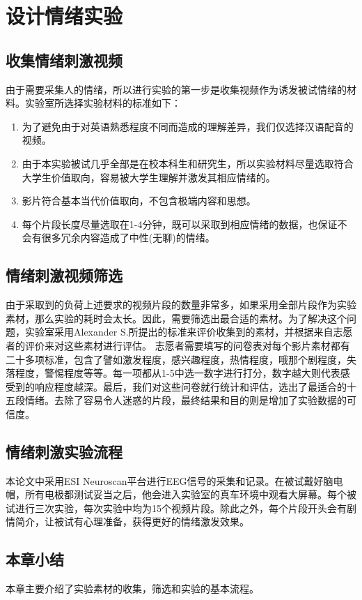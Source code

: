 
\chapter{设计情绪实验}
\label{chap:chap4}

\section{收集情绪刺激视频}
	由于需要采集人的情绪，所以进行实验的第一步是收集视频作为诱发被试情绪的材料。实验室所选择实验材料的标准如下：
	\begin{enumerate}
	\item 为了避免由于对英语熟悉程度不同而造成的理解差异，我们仅选择汉语配音的视频。
	\item 由于本实验被试几乎全部是在校本科生和研究生，所以实验材料尽量选取符合大学生价值取向，容易被大学生理解并激发其相应情绪的。
	
	\item 影片符合基本当代价值取向，不包含极端内容和思想。
	\item 每个片段长度尽量选取在1-4分钟，既可以采取到相应情绪的数据，也保证不会有很多冗余内容造成了中性(无聊)的情绪。
	\end{enumerate}
	
\section{情绪刺激视频筛选}
	由于采取到的负荷上述要求的视频片段的数量非常多，如果采用全部片段作为实验素材，那么实验的耗时会太长。因此，需要筛选出最合适的素材。为了解决这个问题，实验室采用Alexander S.所提出的标准来评价收集到的素材，并根据来自志愿者的评价来对这些素材进行评估。
	志愿者需要填写的问卷表对每个影片素材都有二十多项标准，包含了譬如激发程度，感兴趣程度，热情程度，哦那个剧程度，失落程度，警惕程度等等。每一项都从1-5中选一数字进行打分，数字越大则代表感受到的响应程度越深。最后，我们对这些问卷就行统计和评估，选出了最适合的十五段情绪。去除了容易令人迷惑的片段，最终结果和目的则是增加了实验数据的可信度。
	
\section{情绪刺激实验流程}
	本论文中采用ESI Neuroscan平台进行EEG信号的采集和记录。在被试戴好脑电帽，所有电极都测试妥当之后，他会进入实验室的真车环境中观看大屏幕。每个被试进行三次实验，每次实验中均为15个视频片段。除此之外，每个片段开头会有剧情简介，让被试有心理准备，获得更好的情绪激发效果。
\section{本章小结}
	本章主要介绍了实验素材的收集，筛选和实验的基本流程。
